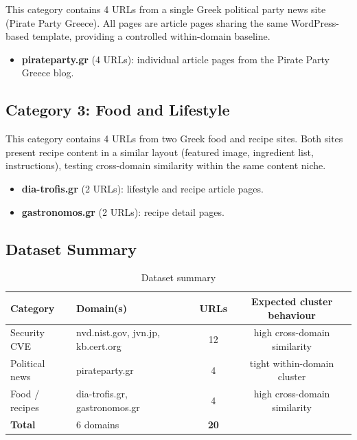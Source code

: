 This category contains 4 URLs from a single Greek political party news site (Pirate Party Greece). All pages are article pages sharing the same WordPress-based template, providing a controlled within-domain baseline.

\begin{itemize}
    \item \textbf{pirateparty.gr} (4 URLs): individual article pages from the Pirate Party Greece blog.
\end{itemize}

\subsection{Category 3: Food and Lifestyle}
\label{subsec:cat-food}

This category contains 4 URLs from two Greek food and recipe sites. Both sites present recipe content in a similar layout (featured image, ingredient list, instructions), testing cross-domain similarity within the same content niche.

\begin{itemize}
    \item \textbf{dia-trofis.gr} (2 URLs): lifestyle and recipe article pages.
    \item \textbf{gastronomos.gr} (2 URLs): recipe detail pages.
\end{itemize}

\subsection{Dataset Summary}
\label{subsec:dataset-summary}

\begin{table}[htbp]
\centering
\caption{Dataset summary}
\label{tab:dataset-summary}
\begin{tabular}{llcc}
\toprule
\textbf{Category} & \textbf{Domain(s)} & \textbf{URLs} & \textbf{Expected cluster behaviour} \\
\midrule
Security CVE & nvd.nist.gov, jvn.jp, kb.cert.org & 12 & high cross-domain similarity \\
Political news & pirateparty.gr & 4 & tight within-domain cluster \\
Food / recipes & dia-trofis.gr, gastronomos.gr & 4 & high cross-domain similarity \\
\midrule
\textbf{Total} & 6 domains & \textbf{20} & \\
\bottomrule
\end{tabular}
\end{table}

